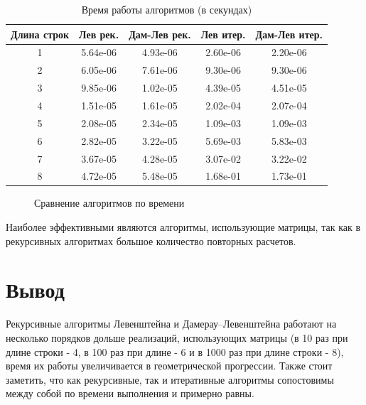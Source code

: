 \documentclass[a4paper,14pt, unknownkeysallowed]{extreport}
\newcommand{\img}[3] {
	\begin{figure}[h!]
		\center{\texttt{[image: img/\#2]}}
		\caption{#3}
		\label{img:#2}
	\end{figure}
}
\begin{document}
\begin{table}[h]
	\begin{center}
		\begin{threeparttable}
		\captionsetup{justification=raggedright,singlelinecheck=off}
		\caption{Время работы алгоритмов (в секундах)}
		\label{tbl:time_measurements}
		\begin{tabular}{|c|c|c|c|c|}
			\hline
			Длина строк &  Лев рек.  & Дам-Лев рек. & Лев итер. & Дам-Лев итер. \\
			\hline
			1    & 5.64e-06 & 4.93e-06 & 2.60e-06 & 2.20e-06 \\ 
			\hline
			2    & 6.05e-06 & 7.61e-06 & 9.30e-06 & 9.30e-06 \\ 
			\hline
			3    & 9.85e-06 & 1.02e-05 & 4.39e-05 & 4.51e-05 \\ 
			\hline
			4    & 1.51e-05 & 1.61e-05 & 2.02e-04 & 2.07e-04 \\ 
			\hline
			5    & 2.08e-05 & 2.34e-05 & 1.09e-03 & 1.09e-03 \\ 
			\hline
			6    & 2.82e-05 & 3.22e-05 & 5.69e-03 & 5.83e-03 \\ 
			\hline
			7    & 3.67e-05 & 4.28e-05 & 3.07e-02 & 3.22e-02 \\ 
			\hline
			8    & 4.72e-05 & 5.48e-05 & 1.68e-01 & 1.73e-01 \\ 
			\hline
		\end{tabular}
		\end{threeparttable}
    \end{center}
\end{table}


\img{114mm}{time_measurements}{Сравнение алгоритмов по времени}
\clearpage


Наиболее эффективными являются алгоритмы, использующие матрицы, так как в рекурсивных алгоритмах большое количество повторных расчетов.

\section{Вывод}

Рекурсивные алгоритмы Левенштейна и Дамерау–Левенштейна работают на несколько порядков дольше реализаций, использующих матрицы (в 10 раз при длине строки - 4, в 100 раз при длине - 6 и в 1000 раз при длине строки - 8), время их работы увеличивается в геометрической прогрессии. Также стоит заметить, что как рекурсивные, так и итеративные алгоритмы сопостовимы между собой по времени выполнения и примерно равны.
\end{document}
